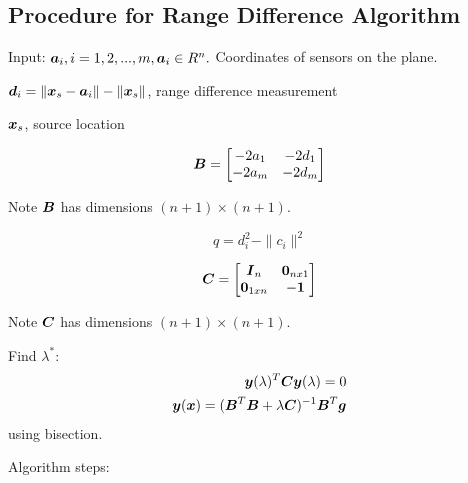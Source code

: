 \subsection{Procedure for Range Difference Algorithm}

Input: $\mbox{\boldmath$a$}_i, i = 1, 2,...,m, \mbox{\boldmath$a$}_i \in R^n.$ Coordinates of sensors on the plane.

$\mbox{\boldmath$d$}_i = \|\mbox{\boldmath$x$}_s - \mbox{\boldmath$a$}_i\| - \|\mbox{\boldmath$x$}_s\|$, range difference measurement

$\mbox{\boldmath$x$}_s$, source location

\begin{equation}
\mbox{\boldmath$B$} = \begin{bmatrix}
-2a_1 & -2d_1 \\
-2a_m & -2d_m
\end{bmatrix}
\end{equation}

Note $\mbox{\boldmath$B$}$ has dimensions $(n+1) \times (n+1)$.

\begin{equation}
q = d_i^2 - \|c_i\|^2
\end{equation}

\begin{equation}
\mbox{\boldmath$C$} = \begin{bmatrix}
\mbox{\boldmath$I$}_n & \mbox{\boldmath$0$}_{nx1} \\
\mbox{\boldmath$0$}_{1xn} & -\mbox{\boldmath$1$}
\end{bmatrix}
\end{equation}

Note $\mbox{\boldmath$C$}$ has dimensions $(n + 1) \times (n + 1)$.

Find $\lambda^*$:
\begin{eqnarray}
\nonumber
\mbox{\boldmath$y$}(\lambda)^T\mbox{\boldmath$C$}\mbox{\boldmath$y$}(\lambda) = 0 \\
\nonumber
\mbox{\boldmath$y$}(\mbox{\boldmath$x$}) = (\mbox{\boldmath$B$}^T\mbox{\boldmath$B$} + \lambda\mbox{\boldmath$C$})^{-1}\mbox{\boldmath$B$}^T\mbox{\boldmath$g$}
\end{eqnarray}
using bisection.

Algorithm steps:

